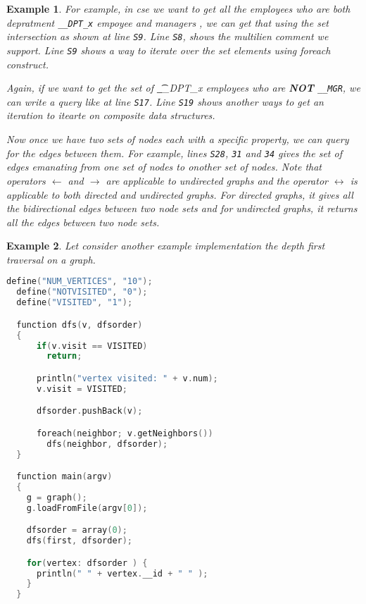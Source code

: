 \documentclass[letterpaper]{sig-alternate} \special{papersize=8.5in,11in}
\newtheorem{example}{Example}
\begin{document}
\begin{example}
{  For example, in cse we want to get all the employees who are both depratment {\tt \_\_DPT\_x} empoyee and managers
  , we can get that using the set intersection as shown at line {\tt S9}. Line {\tt S8}, shows the multilien 
  comment we support. Line {\tt S9} shows a way to iterate over the set elements using foreach construct.

  Again, if we want to get the  set of {\t \_\_DPT\_x} employees who are \textbf{NOT} {\tt \_\_MGR},
  we can write a query like at line {\tt S17}. Line {\tt S19} shows another ways to get an iteration to itearte on 
    composite data structures. 

 Now once we have two sets of nodes each with a specific property, we can query for the edges between them.
 For example, lines {\tt S28}, {\tt 31} and {\tt 34} gives the set of edges emanating from one set of nodes
 to onother set of nodes. Note that operators $\leftarrow$ and $\rightarrow$ are applicable to undirected graphs
 and the operator $\leftrightarrow$ is applicable to both directed and undirected graphs. For directed graphs,
 it gives all the bidirectional edges between two node sets and for undirected graphs, it returns all the edges between
   two node sets.
    \hfill\psframebox{}}
\end{example}

\begin{example} {\rm

  Let consider another example implementation
    the depth first traversal on a graph.

\begin{lstlisting}[language=C++,basicstyle=\tiny]
  define("NUM_VERTICES", "10");
  define("NOTVISITED", "0");
  define("VISITED", "1");

  function dfs(v, dfsorder)
  {
      if(v.visit == VISITED)
        return;

      println("vertex visited: " + v.num);
      v.visit = VISITED;

      dfsorder.pushBack(v);

      foreach(neighbor; v.getNeighbors())
        dfs(neighbor, dfsorder);
  }

  function main(argv)
  {
    g = graph();
    g.loadFromFile(argv[0]);

    dfsorder = array(0);
    dfs(first, dfsorder);

    for(vertex: dfsorder ) {
      println(" " + vertex.__id + " " );
    }
  }

\end{lstlisting}

    \hfill\psframebox{}}
\end{example}
\end{document}
